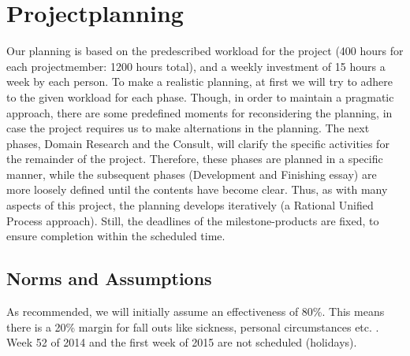 \documentclass{article}
\begin{document}
\section{Projectplanning}
Our planning is based on the predescribed workload for the project (400 hours for each projectmember: 1200 hours total), and a weekly investment of 15 hours a week by each person. To make a realistic planning, at first we will try to adhere to the given workload for each phase.  Though, in order to maintain a pragmatic approach, there are some predefined moments for reconsidering the planning, in case the project requires us to make alternations in the planning. The next phases, Domain Research and the Consult, will clarify the specific activities for the remainder of the project. Therefore, these phases are planned in a specific manner, while the subsequent phases (Development and Finishing essay) are more loosely defined until the contents have become clear. Thus, as with many aspects of this project, the planning develops iteratively (a Rational Unified Process approach). Still, the deadlines of the milestone-products are fixed, to ensure completion within the scheduled time.

\subsection{Norms and Assumptions}
As recommended, we will initially assume an effectiveness of 80\%. This means there is a 20\% margin for fall outs like sickness, personal circumstances etc. . Week 52 of 2014 and the first week of 2015 are not scheduled (holidays). 
\end{document}

